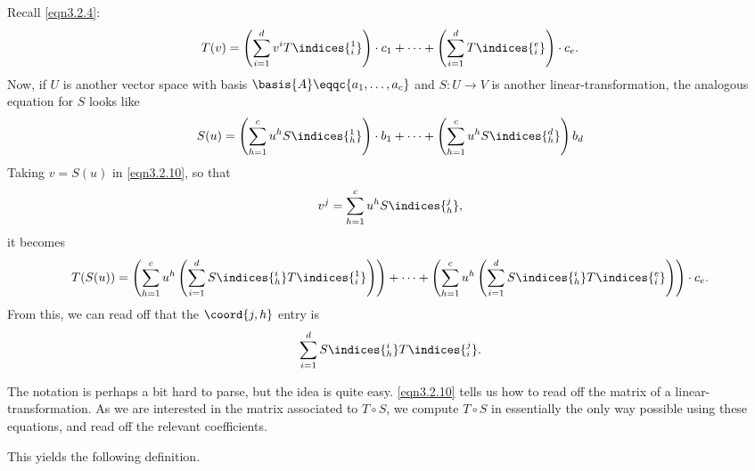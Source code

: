 Recall \eqref{eqn3.2.4}:
\begin{equation}\label{eqn3.2.10}
T(v)=\left( \sum _{i=1}^dv^iT\indices{^1_i}\right) \cdot c_1+\cdots +\left( \sum _{i=1}^dT\indices{^e_i}\right) \cdot c_e.
\end{equation}
Now, if $U$ is another vector space with basis $\basis{A}\eqqc \{ a_1,\ldots ,a_c\}$ and $S\colon U\rightarrow V$ is another linear-transformation, the analogous equation for $S$ looks like
\begin{equation}
	S(u)=\left( \sum _{h=1}^cu^hS\indices{^1_h}\right) \cdot b_1+\cdots +\left( \sum _{h=1}^cu^hS\indices{^d_h}\right) b_d
\end{equation}
Taking $v=S(u)$ in \eqref{eqn3.2.10}, so that
\begin{equation}
	v^j=\sum _{h=1}^cu^hS\indices{^j_h},
\end{equation}
it becomes
\begin{equation*}
	T(S(u))=\left( \sum _{h=1}^cu^h\left( \sum _{i=1}^dS\indices{^i_h}T\indices{^1_i}\right) \right) +\cdots +\left( \sum _{h=1}^cu^h\left( \sum _{i=1}^dS\indices{^i_h}T\indices{^e_i}\right) \right) \cdot c_e.
\end{equation*}
From this, we can read off that the $\coord{j,h}$ entry is
\begin{equation}
	\sum _{i=1}^dS\indices{^i_h}T\indices{^j_i}.
\end{equation}
\begin{rmk}
	The notation is perhaps a bit hard to parse, but the idea is quite easy.  \eqref{eqn3.2.10} tells us how to read off the matrix of a linear-transformation.  As we are interested in the matrix associated to $T\circ S$, we compute $T\circ S$ in essentially the only way possible using these equations, and read off the relevant coefficients.
\end{rmk}
This yields the following definition.

